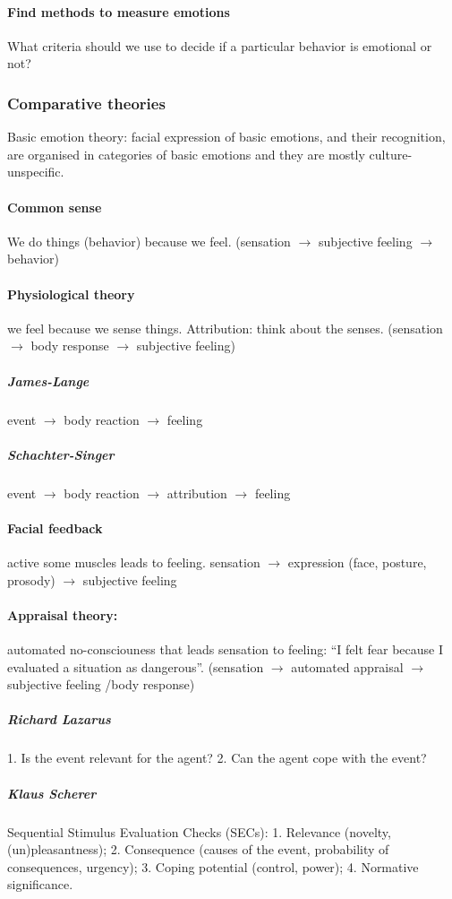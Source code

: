 \documentclass[12pt,article,oneside,a4paper]{memoir}
\begin{document}
\paragraph{Find methods to measure emotions}
What criteria should we use to decide if a particular behavior is emotional or
not?

\subsubsection{Comparative theories}
Basic emotion theory: facial expression of basic emotions, and their
recognition, are organised in categories of basic emotions and they are mostly
culture-unspecific.

\paragraph{Common sense}
We do things (behavior) because we feel.
(sensation $\rightarrow$ subjective feeling $\rightarrow$ behavior)
\paragraph{Physiological theory}
we feel because we sense things. Attribution: think about the senses.
(sensation $\rightarrow$ body response $\rightarrow$ subjective feeling)
\subparagraph{James-Lange} event $\rightarrow$ body reaction $\rightarrow$
feeling
\subparagraph{Schachter-Singer} event $\rightarrow$ body reaction $\rightarrow$
attribution $\rightarrow$ feeling
\paragraph{Facial feedback} active some muscles leads to feeling. sensation
$\rightarrow$ expression (face, posture, prosody) $\rightarrow$ subjective
feeling
\paragraph{Appraisal theory:} automated no-consciouness that leads sensation to
feeling: ``I felt fear because I evaluated a situation as dangerous''.
(sensation $\rightarrow$ automated appraisal $\rightarrow$ subjective feeling
/body response)
\subparagraph{Richard Lazarus} 1. Is the event relevant for the agent? 2.
Can the agent cope with the event?
\subparagraph{Klaus Scherer} Sequential Stimulus Evaluation Checks (SECs):
1. Relevance (novelty, (un)pleasantness); 2. Consequence (causes of the event,
probability of consequences, urgency); 3. Coping potential (control, power);
4. Normative significance.
\end{document}
